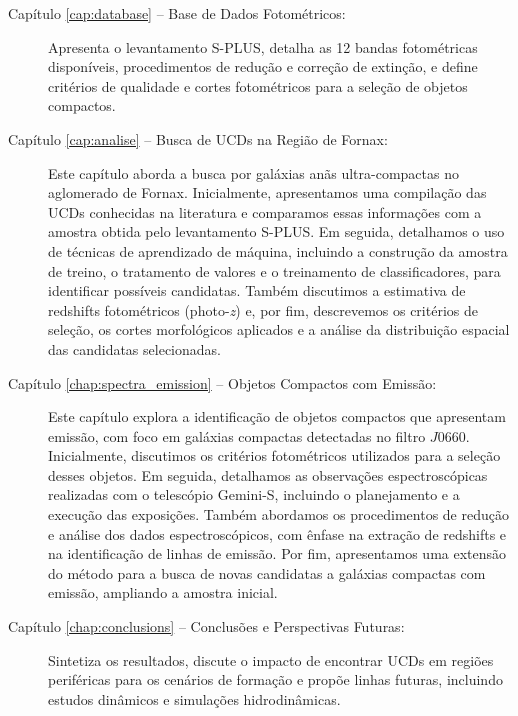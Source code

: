 \begin{description}
\item[Capítulo \ref{cap:database} – Base de Dados Fotométricos:] Apresenta o levantamento S-PLUS, detalha as 12 bandas fotométricas disponíveis, procedimentos de redução e correção de extinção, e define critérios de qualidade e cortes fotométricos para a seleção de objetos compactos.

\item[Capítulo \ref{cap:analise} – Busca de UCDs na Região de Fornax:] Este capítulo aborda a busca por galáxias anãs ultra-compactas no aglomerado de Fornax. Inicialmente, apresentamos uma compilação das UCDs conhecidas na literatura e comparamos essas informações com a amostra obtida pelo levantamento S-PLUS. Em seguida, detalhamos o uso de técnicas de aprendizado de máquina, incluindo a construção da amostra de treino, o tratamento de valores e o treinamento de classificadores, para identificar possíveis candidatas. Também discutimos a estimativa de redshifts fotométricos (photo-\textit{z}) e, por fim, descrevemos os critérios de seleção, os cortes morfológicos aplicados e a análise da distribuição espacial das candidatas selecionadas.

\item[Capítulo \ref{chap:spectra_emission} – Objetos Compactos com Emissão:] Este capítulo explora a identificação de objetos compactos que apresentam emissão, com foco em galáxias compactas detectadas no filtro $J0660$. Inicialmente, discutimos os critérios fotométricos utilizados para a seleção desses objetos. Em seguida, detalhamos as observações espectroscópicas realizadas com o telescópio Gemini-S, incluindo o planejamento e a execução das exposições. Também abordamos os procedimentos de redução e análise dos dados espectroscópicos, com ênfase na extração de redshifts e na identificação de linhas de emissão. Por fim, apresentamos uma extensão do método para a busca de novas candidatas a galáxias compactas com emissão, ampliando a amostra inicial.

\item[Capítulo \ref{chap:conclusions} – Conclusões e Perspectivas Futuras:] Sintetiza os resultados, discute o impacto de encontrar UCDs em regiões periféricas para os cenários de formação e propõe linhas futuras, incluindo estudos dinâmicos e simulações hidrodinâmicas.

\end{description}


